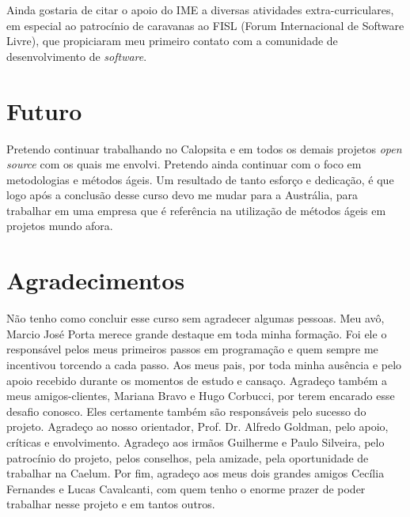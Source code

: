 \documentclass[titlepage,a4paper]{article}
\newcommand{\opensource}{\textit{open source}}
\newcommand{\software}{\textit{software}}
\newcommand{\calopsita}{Calopsita}
\begin{document}
Ainda gostaria de citar o apoio do IME a diversas atividades extra-curriculares, em especial ao patrocínio de caravanas ao FISL (Forum Internacional de Software Livre), que propiciaram meu primeiro contato com a comunidade de desenvolvimento de \software{}.

\section{Futuro}

Pretendo continuar trabalhando no \calopsita{} e em todos os demais projetos \opensource{} com os quais me envolvi. Pretendo ainda continuar com o foco em metodologias e métodos ágeis. Um resultado de tanto esforço e dedicação, é que logo após a conclusão desse curso devo me mudar para a Austrália, para trabalhar em uma empresa que é referência na utilização de métodos ágeis em projetos mundo afora.

\section{Agradecimentos}
Não tenho como concluir esse curso sem agradecer algumas pessoas. Meu avô, Marcio José Porta merece grande destaque em toda minha formação. Foi ele o responsável pelos meus primeiros passos em programação e quem sempre me incentivou torcendo a cada passo. Aos meus pais, por toda minha ausência e pelo apoio recebido durante os momentos de estudo e cansaço. Agradeço também a meus amigos-clientes, Mariana Bravo e Hugo Corbucci, por terem encarado esse desafio conosco. Eles certamente também são responsáveis pelo sucesso do projeto. Agradeço ao nosso orientador, Prof. Dr. Alfredo Goldman, pelo apoio, críticas e envolvimento. Agradeço aos irmãos Guilherme e Paulo Silveira, pelo patrocínio do projeto, pelos conselhos, pela amizade, pela oportunidade de trabalhar na Caelum. Por fim, agradeço aos meus dois grandes amigos Cecília Fernandes e Lucas Cavalcanti, com quem tenho o enorme prazer de poder trabalhar nesse projeto e em tantos outros.
\end{document}
